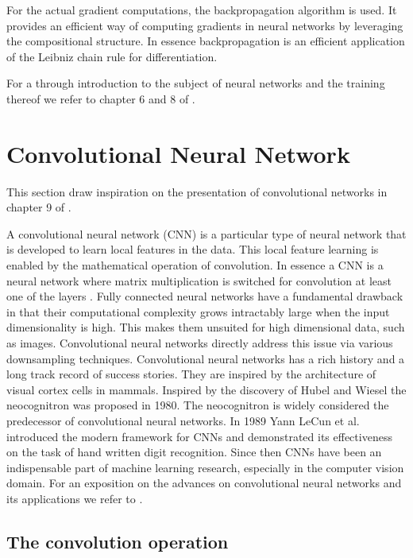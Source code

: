 \documentclass[../../thesis.tex]{subfiles}
\begin{document}
For the actual gradient computations, the backpropagation algorithm is used. It provides an efficient way of computing gradients in neural networks by leveraging the compositional structure. In essence backpropagation is an efficient application of the Leibniz chain rule for differentiation.\newline

For a through introduction to the subject of neural networks and the training thereof we refer to chapter 6 and 8 of \cite{deeplearningbook}.


\section{Convolutional Neural Network}
This section draw inspiration on the presentation of convolutional networks in chapter 9 of \cite{deeplearningbook}.\newline

A convolutional neural network (CNN) is a particular type of neural network that is developed to learn local features in the data. This local feature learning is enabled by the mathematical operation of convolution. In essence a CNN is a neural network where matrix multiplication is switched for convolution at least one of the layers \cite{deeplearningbook}. \newline
Fully connected neural networks have a fundamental drawback in that their computational complexity grows intractably large when the input dimensionality is high. This makes them unsuited for high dimensional data, such as images. Convolutional neural networks directly address this issue via various downsampling techniques. Convolutional neural networks has a rich history and a long track record of success stories. They are inspired by the architecture of visual cortex cells in mammals. Inspired by the discovery of Hubel and Wiesel \cite{https://doi.org/10.1113/jphysiol.1968.sp008455} the neocognitron was proposed in 1980\cite{6313076}. The neocognitron is widely considered the predecessor of convolutional neural networks. In 1989 Yann LeCun et al. introduced the modern framework for CNNs \cite{LeCun1989ConvNet} and demonstrated its effectiveness on the task of hand written digit recognition. Since then CNNs have been an indispensable part of machine learning research, especially in the computer vision domain. For an exposition on the advances on convolutional neural networks and its applications we refer to \cite{gu2017recent}.

\subsection{The convolution operation}
\end{document}
